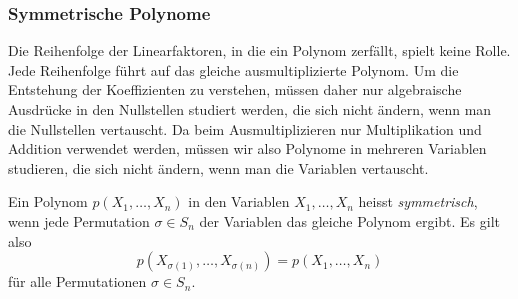 %
%
\subsubsection{Symmetrische Polynome}
Die Reihenfolge der Linearfaktoren, in die ein Polynom zerfällt, spielt
keine Rolle.
Jede Reihenfolge führt auf das gleiche ausmultiplizierte Polynom.
Um die Entstehung der Koeffizienten zu verstehen, müssen daher nur
algebraische Ausdrücke in den Nullstellen studiert werden, die sich nicht
ändern, wenn man die Nullstellen vertauscht.
Da beim Ausmultiplizieren nur Multiplikation und Addition verwendet
werden, müssen wir also Polynome in mehreren Variablen studieren, die
sich nicht ändern, wenn man die Variablen vertauscht.

\begin{definition}
%
Ein Polynom $p(X_1,\dots,X_n)$ in den Variablen $X_1,\dots,X_n$
heisst \emph{symmetrisch}, wenn jede Permutation $\sigma\in S_n$
der Variablen das gleiche Polynom ergibt.
Es gilt also
\[
p(X_{\sigma(1)},\dots,X_{\sigma(n)})
=
p(X_1,\dots,X_n)
\]
für alle Permutationen $\sigma\in S_n$.
\end{definition}

